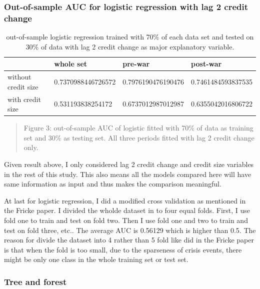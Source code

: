 \documentclass{article}
\newcommand{\ciapdf}[1]{\vspace*{-\parskip}\begin{center}\resizebox{0.75\textwidth}{!}{\texttt{[image: \#1]}}\end{center}}
\begin{document}
\subsubsection*{Out-of-sample AUC for logistic regression with lag 2 credit change}

\begin{table}[H]
    \caption{out-of-sample logistic regression trained with 70\% of
    each data set and tested on 30\% of data with lag 2 credit change
    as major explanatory variable.
    }
    \begin{center}\begin{tabular}{|l|l|l|l|}
    \hline
                        & whole set          & pre-war            & post-war           \\ \hline
    without credit size & 0.7370988446726572 & 0.7976190476190476 & 0.7461484593837535 \\ \hline
    with credit size    & 0.531193838254172  & 0.6737012987012987 & 0.6355042016806722 \\ \hline
    \end{tabular}\end{center}
\end{table}

\ciapdf{Figure_4.pdf}
\begin{quote}
Figure 3: out-of-sample AUC of logistic fitted with 70\% of
data as training set and 30\% as testing set. All three periods
fitted with lag 2 credit change only.
\end{quote}

Given result above, I only considered lag 2 credit change and credit
size variables in the rest of this study. This also means all the models
compared here will have
same information as input and thus makes the comparison meaningful.

At last for logistic regression, I did a modified cross validation as
mentioned in the Fricke paper. I divided the wholde dataset in to four
equal folds. First, I use fold one to train and test on fold two. Then I
use fold one and two to train and test on fold three, etc.. The average
AUC is 0.56129 which is higher than 0.5. The reason for divide the
dataset into 4 rather than 5 fold like did in the Fricke paper is that
when the fold is too small, due to the sparseness of crisis events,
there might be only one class in the whole training set or test set.

\subsubsection*{Tree and forest}
\end{document}

